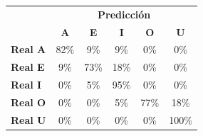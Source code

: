 \begin{tabular}{lccccc}
\toprule
 & \multicolumn{5}{c}{\textbf{Predicción}} \\
 & \textbf{A} & \textbf{E} & \textbf{I} & \textbf{O} & \textbf{U} \\
\midrule
\textbf{Real A} & \cellcolor[rgb]{0.43,0.43,1.00} \color{white} 82\% & \cellcolor[rgb]{0.94,0.94,1.00}  9\% & \cellcolor[rgb]{0.94,0.94,1.00}  9\% & \cellcolor[rgb]{1.00,1.00,1.00}  0\% & \cellcolor[rgb]{1.00,1.00,1.00}  0\% \\
\textbf{Real E} & \cellcolor[rgb]{0.94,0.94,1.00}  9\% & \cellcolor[rgb]{0.49,0.49,1.00} \color{white} 73\% & \cellcolor[rgb]{0.87,0.87,1.00}  18\% & \cellcolor[rgb]{1.00,1.00,1.00}  0\% & \cellcolor[rgb]{1.00,1.00,1.00}  0\% \\
\textbf{Real I} & \cellcolor[rgb]{1.00,1.00,1.00}  0\% & \cellcolor[rgb]{0.97,0.97,1.00}  5\% & \cellcolor[rgb]{0.33,0.33,1.00} \color{white} 95\% & \cellcolor[rgb]{1.00,1.00,1.00}  0\% & \cellcolor[rgb]{1.00,1.00,1.00}  0\% \\
\textbf{Real O} & \cellcolor[rgb]{1.00,1.00,1.00}  0\% & \cellcolor[rgb]{1.00,1.00,1.00}  0\% & \cellcolor[rgb]{0.97,0.97,1.00}  5\% & \cellcolor[rgb]{0.46,0.46,1.00} \color{white} 77\% & \cellcolor[rgb]{0.87,0.87,1.00}  18\% \\
\textbf{Real U} & \cellcolor[rgb]{1.00,1.00,1.00}  0\% & \cellcolor[rgb]{1.00,1.00,1.00}  0\% & \cellcolor[rgb]{1.00,1.00,1.00}  0\% & \cellcolor[rgb]{1.00,1.00,1.00}  0\% & \cellcolor[rgb]{0.30,0.30,1.00} \color{white} 100\% \\
\bottomrule
\end{tabular}